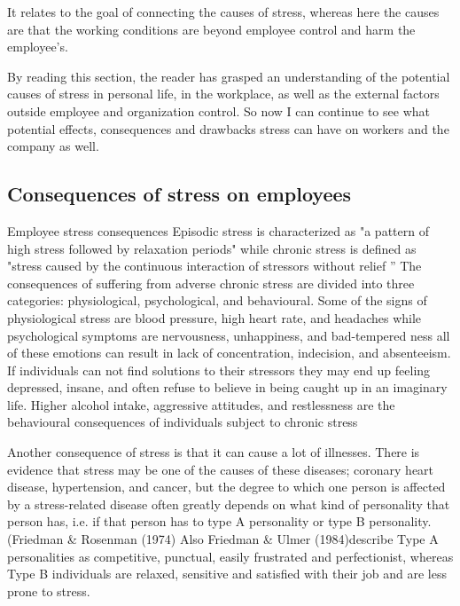 It relates to the goal of connecting the causes of stress, whereas here the causes are that the working conditions are beyond employee control and harm the employee's\cite[p.~10]{Fairbrother2003WorkplaceSatisfaction}.

By reading this section, the reader has grasped an understanding of the potential causes of stress in personal life, in the workplace, as well as the external factors outside employee and organization control.  So now I can continue to see what potential effects, consequences and drawbacks stress can have on workers and the company as well.

\subsection{Consequences of stress on employees}
Employee stress consequences Episodic stress is characterized as "a pattern of high stress followed by relaxation periods" while chronic stress is defined as "stress caused by the continuous interaction of stressors without relief \citep[p.313]{Bloisi2007ManagementBehaviour}” The consequences of suffering from adverse chronic stress are divided into three categories: physiological, psychological, and behavioural. Some of the signs of physiological stress are blood pressure, high heart rate, and headaches while psychological symptoms are nervousness, unhappiness, and bad-tempered ness all of these emotions can result in lack of concentration, indecision, and absenteeism. If individuals can not find solutions to their stressors they may end up feeling depressed, insane, and often refuse to believe in being caught up in an imaginary life. Higher alcohol intake, aggressive attitudes, and restlessness are the behavioural consequences of individuals subject to chronic stress \citep[p.323]{Bloisi2007ManagementBehaviour}

Another consequence of stress is that it can cause a lot of illnesses.  There is evidence that stress may be one of the causes of these diseases; coronary heart disease, hypertension, and cancer, but the degree to which one person is affected by a stress-related disease often greatly depends on what kind of personality that person has, i.e. if that person has to type A personality or type B personality.  (Friedman  \&  Rosenman  (1974)  Also  Friedman  \&  Ulmer (1984)describe Type A personalities as competitive, punctual, easily frustrated and perfectionist, whereas Type B individuals are relaxed, sensitive and satisfied with their job and are less prone to stress.

